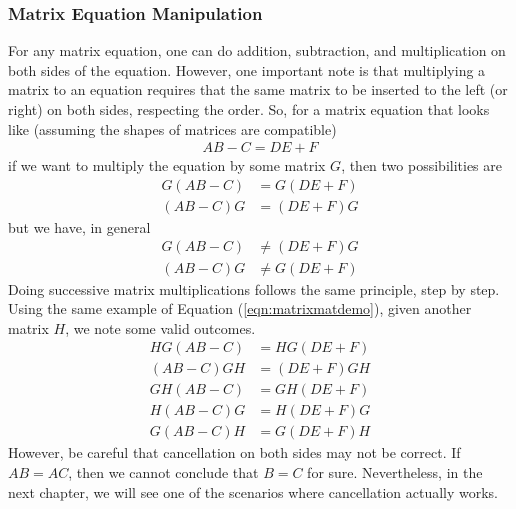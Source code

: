\subsubsection{Matrix Equation Manipulation}
For any matrix equation, one can do addition, subtraction, and multiplication on both sides of the equation. However, one important note is that multiplying a matrix to an equation requires that the same matrix to be inserted to the left (or right) on both sides, respecting the order. So, for a matrix equation that looks like (assuming the shapes of matrices are compatible)
\begin{align}
AB-C = DE+F \label{eqn:matrixmatdemo}
\end{align}
if we want to multiply the equation by some matrix $G$, then two possibilities are
\begin{align*}
G(AB-C) &= G(DE+F) \\
(AB-C)G &= (DE+F)G
\end{align*}
but we have, in general
\begin{align*}
G(AB-C) &\neq (DE+F)G \\
(AB-C)G &\neq G(DE+F)
\end{align*}
Doing successive matrix multiplications follows the same principle, step by step. Using the same example of Equation (\ref{eqn:matrixmatdemo}), given another matrix $H$, we note some valid outcomes.
\begin{align*}
HG(AB-C) &= HG(DE+F) \\
(AB-C)GH &= (DE+F)GH \\
GH(AB-C) &= GH(DE+F) \\
H(AB-C)G &= H(DE+F)G \\
G(AB-C)H &= G(DE+F)H 
\end{align*}
However, be careful that cancellation on both sides may not be correct. If $AB = AC$, then we cannot conclude that $B = C$ for sure. Nevertheless, in the next chapter, we will see one of the scenarios where cancellation actually works.

